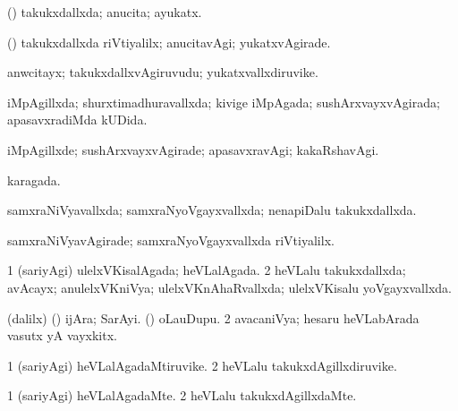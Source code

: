 {{\bentry
{} 
\gl{\gu}
\bmng
(\pArxparx) takukxdallxda; anucita; ayukatx. 
\emng
\eentry

\bentry
{} 
\gl{\kirxvi}
\expl{}
\bmng
(\pArxparx) takukxdallxda riVtiyalilx; anucitavAgi; yukatxvAgirade. 
\emng
\eentry

\bentry
{} 
\gl{\nA}
\expl{}
\bmng
anwcitayx; takukxdallxvAgiruvudu; yukatxvallxdiruvike. 
\emng
\eentry

\bentry
{} 
\gl{\gu}
\expl{}
\bmng
iMpAgillxda; shurxtimadhuravallxda; kivige iMpAgada; sushArxvayxvAgirada; apasavxradiMda kUDida. 
\emng
\eentry

\bentry
{} 
\gl{\kirxvi}
\expl{}
\bmng
iMpAgillxde; sushArxvayxvAgirade; apasavxravAgi; kakaRshavAgi. 
\emng
\eentry

\bentry
{} 
\gl{\gu}
\expl{}
\bmng
karagada. 
\emng
\eentry

\bentry
{} 
\gl{\gu}
\expl{}
\bmng
samxraNiVyavallxda; samxraNyoVgayxvallxda; nenapiDalu takukxdallxda. 
\emng
\eentry

\bentry
{} 
\gl{\kirxvi}
\expl{}
\bmng
samxraNiVyavAgirade; samxraNyoVgayxvallxda riVtiyalilx. 
\emng
\eentry

\bentry
{} 
\gl{\nA}
\expl{}
\bmng
{} 
\emng
\eentry

\bentry
{} 
\gl{\gu}
\expl{}
\bmng
\bnum
\num{1} (sariyAgi) ulelxVKisalAgada; heVLalAgada. 
\num{2} heVLalu takukxdallxda; avAcayx; anulelxVKniVya; ulelxVKnAhaRvallxda; ulelxVKisalu yoVgayxvallxda. 
\enum
\emng
\eentry

\bentry
{} 
\gl{\nA}
\expl{}
\bmng
\bnum
{} 
\banum
{} (\bava dalilx) (\pArxparx) ijAra; SarAyi. 
 (\hA) oLauDupu. 
\eanum
\numie
\num{2} avacaniVya; hesaru heVLabArada vasutx yA vayxkitx. 
\enum
\emng
\eentry

\bentry
{} 
\gl{\nA}
\expl{}
\bmng
\bnum
\num{1} (sariyAgi) heVLalAgadaMtiruvike. 
\num{2} heVLalu takukxdAgillxdiruvike. 
\enum
\emng
\eentry

\bentry
{} 
\gl{\kirxvi}
\expl{}
\bmng
\bnum
\num{1} (sariyAgi) heVLalAgadaMte. 
\num{2} heVLalu takukxdAgillxdaMte. 
\enum
\emng
\eentry

}}
